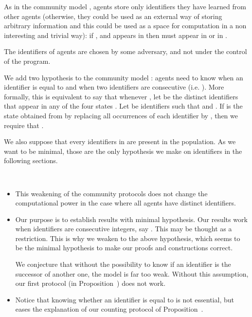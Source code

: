 \documentclass[UKenglish]{llncs}
\begin{document}
As in the community model \cite{guerraoui2009names},  agents store only  identifiers
they have learned from other agents (otherwise, they could be used as
an external way of storing arbitrary information and this could be used as
a space for computation in a non interesting and trivial way): 
if , and  appears in
   then  must appear in  or in .

The identifiers of agents
are chosen by some adversary, and not under the control of the
program. 

We add two hypothesis to the community model \cite{guerraoui2009names}:
agents need to know when an identifier is equal to  and when
two identifiers are consecutive (i.e. ).
More formally, this is equivalent to say that 
whenever , let   
be the distinct  identifiers that appear in any of
  the four states .
Let  be identifiers such that   and .
If  is the state obtained from  by replacing all
  occurrences of each identifier  by , then we require that
  . 


 We also suppose that
every identifiers in  are present in the population. As we want to be
minimal,  those are the only hypothesis we make on identifiers in the following
sections. 






\begin{remark} \ 

\vspace{-0.3cm}
\begin{itemize}
\item This weakening of the community protocols does not change the computational
power in the case where all agents have distinct identifiers.
\item 
Our purpose is to establish results with minimal hypothesis. Our
results work  when identifiers are consecutive integers, say
.  
This may be thought as a restriction. This is why we weaken to the
above hypothesis, which seems to be the minimal hypothesis to make our
proofs and constructions correct. 

We conjecture that without the possibility to know if an identifier is
the successor of another one, the model is far too weak. Without this
assumption, our first protocol (in  Proposition~) does not work.
\item
Notice that 
knowing whether an identifier is equal to  is not essential, but eases
the explanation of our counting protocol of Proposition~.
\end{itemize}
\end{remark}
\end{document}
